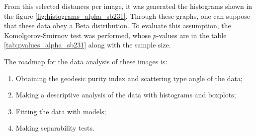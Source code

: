 \documentclass[journal]{IEEEtran}
\begin{document}

\textcolor{red}{\hrulefill}

From this selected distances per image, it was generated the histograms shown in the figure \ref{fig:histograms_alpha_sb231}. Through these graphs, one can suppose that these data obey a Beta distribution. To evaluate this assumption, the Komolgorov-Smirnov test was performed, whose $p$-values are in the table \ref{tab:pvalues_alpha_sb231} along with the sample size.

The roadmap for the data analysis of these images is:
\begin{enumerate}
  \item Obtaining the geodesic purity index and scattering type angle of the data;
  \item Making a descriptive analysis of the data with histograms and boxplots;
  \item Fitting the data with models;
  \item Making separability tests.
\end{enumerate}


% 

\end{document}
